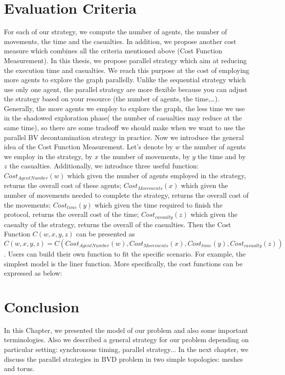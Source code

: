 \section{Evaluation Criteria}
For each of our strategy, we compute the number of agents, the number of movements, the time and the casualties.  In addition, we propose another cost measure which combines all the criteria mentioned above (Cost Function Measurement). In this thesis, we propose parallel strategy which aim at reducing the execution time and casualties. We reach this purpose at the cost of employing more agents to explore the graph parallelly. Unlike the sequential strategy which use only one agent, the parallel strategy are more flexible because you can adjust the strategy based on your resource (the number of agents, the time,\ldots). Generally, the more agents we employ to explore the graph, the less time we use in the shadowed exploration phase( the number of casualties may reduce at the same time), so there are some tradeoff we should make when we want to use the parallel BV decontamination strategy in practice. Now we introduce the general idea of the Cost Function Measurement.
Let's denote by $w$ the number of agents we employ in the strategy, by $x$ the number of movements, by $y$ the time and by $z$ the casualties. Additionally, we introduce three useful function: $Cost_{AgentNumber}(w)$ which given the number of agents employed in the strategy, returns the overall cost of these agents; $Cost_{Movements}(x)$ which given the number of movements needed to complete the strategy, returns the overall cost of the movements; $Cost_{time}(y)$ which given the time required to finish the protocol, returns the overall cost of the time; $Cost_{casualty}(z)$ which given the casualty of the strategy, returns the overall of the casualties. Then the Cost Function $C(w, x, y, z)$ can be presented as $C(w, x, y, z)=C(Cost_{AgentNumber}(w), Cost_{Movements}(x), Cost_{time}(y), Cost_{casualty}(z))$.
Users can build their own function to fit the specific scenario. For example, the simplest model is the liner function. More specifically, the cost functions can be expressed as below:\\
  
\section{Conclusion}
In this Chapter, we presented the model of our problem and also some important terminologies. Also we described a general strategy for our problem depending on particular setting: synchronous timing, parallel strategy... In the next chapter, we discuss the parallel strategies in BVD problem in two simple topologies: meshes and torus. 







 



